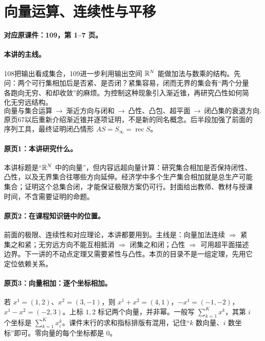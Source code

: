 \clearpage\section{向量运算、连续性与平移}\label{g:109:1}

\textbf{对应原课件：109，第 1--7 页。}


\paragraph{本讲的主线。}
108把输出看成集合，109进一步利用输出空间 $\mathbb{R}^N$ 能做加法与数乘的结构。先问：两个可行集相加后是否紧、是否闭？紧集容易，闭而无界的集会有“两个分量各跑向无穷、和却收敛”的麻烦。为控制这种现象引入渐近锥，再研究凸性如何简化无穷远结构。
\[\text{向量与集合运算}\ \longrightarrow\ \text{渐近方向与闭和}
\ \longrightarrow\ \text{凸性、凸包、超平面}\ \longrightarrow\ \text{闭凸集的衰退方向}.\]
原页67以后重新介绍渐近锥并逐项证明，不是新的同名概念。后半段加强了前面的序列工具，最终证明闭凸情形 $AS=S_\infty=\operatorname{rec}S$。


\paragraph{原页1：本讲研究什么。}本讲标题是“$\mathbb{R}^N$ 中的向量”，但内容远超向量计算：研究集合相加是否保持闭性、凸性，以及无界集合往哪些方向延伸。经济学中多个生产集合相加就是总生产可能集合；证明这个总集合闭，才能保证极限方案仍可行。封面给出教师、教材与授课时间，不含需要证明的命题。



\paragraph{原页2：在课程知识链中的位置。}前面的极限、连续性和对应理论，本讲都要用到。主线是：向量加法连续 $\Rightarrow$ 紧集之和紧；无穷远方向不能互相抵消 $\Rightarrow$ 闭集之和闭；凸性 $\Rightarrow$ 可用超平面描述边界。下一讲的不动点定理又需要紧性与凸性。本页的目录不是一组定理，先用它定位依赖关系。



\paragraph{原页3：向量相加：逐个坐标相加。}若 $x^1=(1,2)$、$x^2=(3,-1)$，则 $x^1+x^2=(4,1)$，$-x^1=(-1,-2)$，$x^1-x^2=(-2,3)$。上标 $1,2$ 标记两个向量，并非幂。一般写 $\sum_{k=1}^K x^k$，其第 $i$ 个坐标是 $\sum_{k=1}^K x_i^k$。课件末行的求和指标排版有混用，记住“$k$ 数向量、$i$ 数坐标”即可。零向量的每个坐标都是 $0$。



